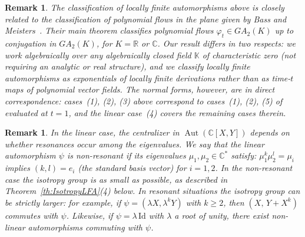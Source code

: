 \documentclass[11pt,a4paper,reqno]{amsart}
\newtheorem{remark}[theorem]{Remark}}
\newcommand{\Aut}[0]{\ensuremath{\operatorname{Aut}}}
\begin{document}
\begin{remark}\label{rem:BassMeisters}
The classification of locally finite automorphisms above is closely related to the classification of polynomial flows in the plane given by Bass and Meisters~\cite{BassMei85}. Their main theorem classifies polynomial flows $\varphi_t\in GA_2(K)$ up to conjugation in $GA_2(K)$, for $K=\mathbb{R}$ or $\mathbb{C}$. Our result differs in two respects: we work algebraically over any algebraically closed field $\mathbb{K}$ of characteristic zero (not requiring an analytic or real structure), and we classify locally finite automorphisms as exponentials of locally finite derivations rather than as time-$t$ maps of polynomial vector fields. The normal forms, however, are in direct correspondence: cases~(1), (2), (3) above correspond to cases~(1), (2), (5) of \cite[Theorem~(4.3)]{BassMei85} evaluated at $t=1$, and the linear case~(4) covers the remaining cases therein.
\end{remark}
 
\begin{remark}\label{rem:linear-resonance}
In the linear case, the centralizer in $\Aut(\mathbb{C}[X,Y])$ depends on whether resonances occur among the eigenvalues. We say that the linear automorphism $\psi$ is \emph{non-resonant} if its eigenvalues $\mu_1,\mu_2\in\mathbb{C}^*$ satisfy: $\mu_1^k\mu_2^l=\mu_i$ implies $(k,l)=e_i$ (the standard basis vector) for $i=1,2$. In the non-resonant case the isotropy group is as small as possible, as described in Theorem~\ref{th:IsotropyLFA}(4) below. In resonant situations the isotropy group can be strictly larger: for example, if $\psi=(\lambda X,\lambda^k Y)$ with $k\ge 2$, then $(X,\,Y+X^k)$ commutes with $\psi$. Likewise, if $\psi=\lambda\,\mathrm{Id}$ with $\lambda$ a root of unity, there exist non-linear automorphisms commuting with $\psi$.
\end{remark}
 
\end{document}
